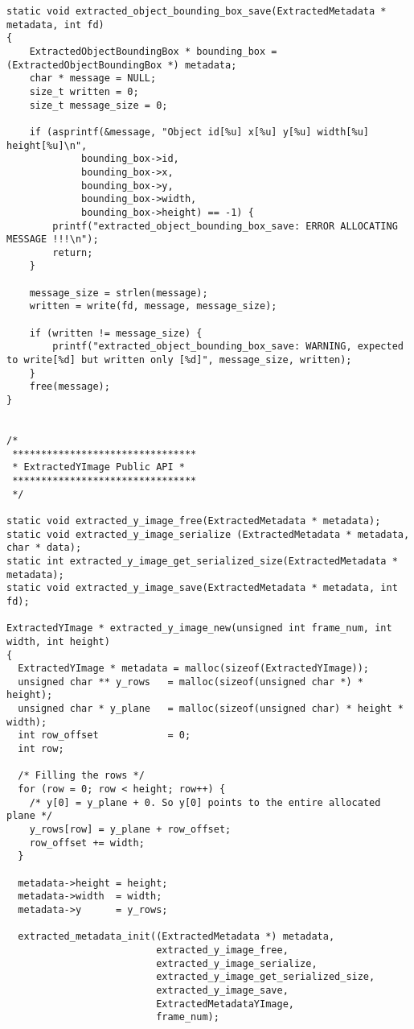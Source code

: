 \begin{lstlisting}
static void extracted_object_bounding_box_save(ExtractedMetadata * metadata, int fd)
{
    ExtractedObjectBoundingBox * bounding_box = (ExtractedObjectBoundingBox *) metadata;
    char * message = NULL;
    size_t written = 0;
    size_t message_size = 0;

    if (asprintf(&message, "Object id[%u] x[%u] y[%u] width[%u] height[%u]\n", 
             bounding_box->id, 
             bounding_box->x, 
             bounding_box->y, 
             bounding_box->width, 
             bounding_box->height) == -1) {
        printf("extracted_object_bounding_box_save: ERROR ALLOCATING MESSAGE !!!\n");
        return;
    }

    message_size = strlen(message);
    written = write(fd, message, message_size);

    if (written != message_size) {
        printf("extracted_object_bounding_box_save: WARNING, expected to write[%d] but written only [%d]", message_size, written);
    }
    free(message);
}


/*
 ********************************
 * ExtractedYImage Public API *
 ********************************
 */

static void extracted_y_image_free(ExtractedMetadata * metadata);
static void extracted_y_image_serialize (ExtractedMetadata * metadata, char * data);
static int extracted_y_image_get_serialized_size(ExtractedMetadata * metadata);
static void extracted_y_image_save(ExtractedMetadata * metadata, int fd);

ExtractedYImage * extracted_y_image_new(unsigned int frame_num, int width, int height)
{
  ExtractedYImage * metadata = malloc(sizeof(ExtractedYImage));
  unsigned char ** y_rows   = malloc(sizeof(unsigned char *) * height);
  unsigned char * y_plane   = malloc(sizeof(unsigned char) * height * width);
  int row_offset            = 0;
  int row;

  /* Filling the rows */
  for (row = 0; row < height; row++) {
    /* y[0] = y_plane + 0. So y[0] points to the entire allocated plane */
    y_rows[row] = y_plane + row_offset;
    row_offset += width;
  }

  metadata->height = height;
  metadata->width  = width;
  metadata->y      = y_rows;
  
  extracted_metadata_init((ExtractedMetadata *) metadata,
                          extracted_y_image_free,
                          extracted_y_image_serialize,
                          extracted_y_image_get_serialized_size,
                          extracted_y_image_save,
                          ExtractedMetadataYImage,
                          frame_num);


\end{lstlisting}
